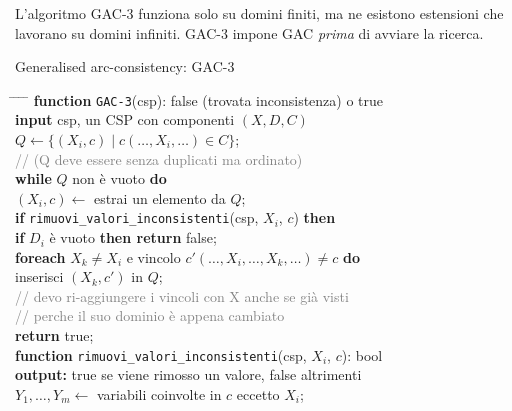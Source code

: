 \documentclass[a4paper,11pt]{report}
\begin{document}
L'algoritmo GAC-3 funziona solo su domini finiti, ma ne esistono estensioni che lavorano su domini infiniti. GAC-3 impone GAC \textit{prima} di avviare la ricerca.

\begin{gframe}{Generalised arc-consistency: GAC-3}{}
\begin{tcolorbox}[colback=gray!10, colframe=gray!10, arc=4pt, boxrule=0pt, left=5pt, right=5pt, top=5pt, bottom=5pt]
    \begin{tabbing}
        \hspace{0.5cm} \= \hspace{0.5cm} \= \hspace{0.5cm} \= \hspace{0.5cm} \= \kill
        \textbf{function} \texttt{GAC-3}(csp): false (trovata inconsistenza) o true \\
        \> \textbf{input} csp, un CSP con componenti $(X, D, C)$ \\
        \> $Q \leftarrow \{(X_i, c) \mid c(\dots, X_i, \dots) \in C\}$; \\
        \> \textcolor{gray}{// (Q deve essere senza duplicati ma ordinato)} \\
        \> \textbf{while} $Q$ non è vuoto \textbf{do} \\
        \> \> $(X_i, c) \leftarrow$ estrai un elemento da $Q$; \\
        \> \> \textbf{if} \texttt{rimuovi\_valori\_inconsistenti}(csp, $X_i$, $c$) \textbf{then} \\
        \> \> \> \textbf{if} $D_i$ è vuoto \textbf{then return} false; \\
        \> \> \> \textbf{foreach} $X_k \neq X_i$ e vincolo $c'(\dots, X_i, \dots, X_k, \dots) \neq c$ \textbf{do} \\
        \> \> \> \> inserisci $(X_k, c')$ in $Q$;  \\
        \> \> \> \> \textcolor{gray}{// devo ri-aggiungere i vincoli con X anche se già visti} \\
        \> \> \> \> \textcolor{gray}{// perche il suo dominio è appena cambiato } \\
        \> \textbf{return} true; \\[0.3cm]
        \textbf{function} \texttt{rimuovi\_valori\_inconsistenti}(csp, $X_i$, $c$): bool \\
        \> \textbf{output:} true se viene rimosso un valore, false altrimenti \\
        \> $Y_1, \dots, Y_m \leftarrow$ variabili coinvolte in $c$ eccetto $X_i$; \\

\end{tabbing}
\end{tcolorbox}
\end{gframe}
\end{document}
